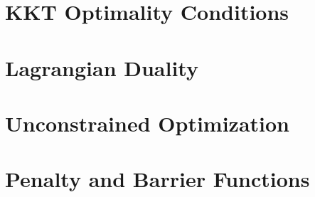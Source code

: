 	\chapter{KKT Optimality Conditions}

	\chapter{Lagrangian Duality}

	\chapter{Unconstrained Optimization}

	\chapter{Penalty and Barrier Functions}